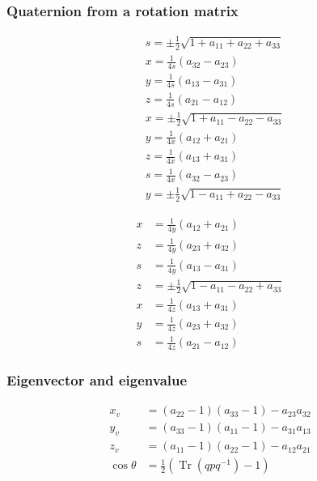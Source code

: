 \subsubsection*{Quaternion from a rotation matrix}
$$
\begin{aligned}
& s=\pm \frac{1}{2} \sqrt{1+a_{11}+a_{22}+a_{33}} \\
& x=\frac{1}{4 s}\left(a_{32}-a_{23}\right) \\
& y=\frac{1}{4 s}\left(a_{13}-a_{31}\right) \\
& z=\frac{1}{4 s}\left(a_{21}-a_{12}\right) \\
& x=\pm \frac{1}{2} \sqrt{1+a_{11}-a_{22}-a_{33}} \\
& y=\frac{1}{4 x}\left(a_{12}+a_{21}\right) \\
& z=\frac{1}{4 x}\left(a_{13}+a_{31}\right) \\
& s=\frac{1}{4 x}\left(a_{32}-a_{23}\right) \\
& y=\pm \frac{1}{2} \sqrt{1-a_{11}+a_{22}-a_{33}}
\end{aligned}
$$

$$
\begin{aligned}
x & =\frac{1}{4 y}\left(a_{12}+a_{21}\right) \\
z & =\frac{1}{4 y}\left(a_{23}+a_{32}\right) \\
s & =\frac{1}{4 y}\left(a_{13}-a_{31}\right) \\
z & =\pm \frac{1}{2} \sqrt{1-a_{11}-a_{22}+a_{33}} \\
x & =\frac{1}{4 z}\left(a_{13}+a_{31}\right) \\
y & =\frac{1}{4 z}\left(a_{23}+a_{32}\right) \\
s & =\frac{1}{4 z}\left(a_{21}-a_{12}\right)
\end{aligned}
$$

\subsubsection*{Eigenvector and eigenvalue}
$$
\begin{aligned}
x_{v} & =\left(a_{22}-1\right)\left(a_{33}-1\right)-a_{23} a_{32} \\
y_{v} & =\left(a_{33}-1\right)\left(a_{11}-1\right)-a_{31} a_{13} \\
z_{v} & =\left(a_{11}-1\right)\left(a_{22}-1\right)-a_{12} a_{21} \\
\cos \theta & =\frac{1}{2}\left(\operatorname{Tr}\left(q p q^{-1}\right)-1\right)
\end{aligned}
$$

